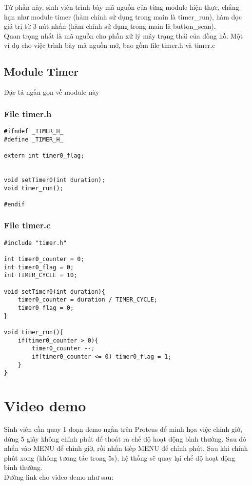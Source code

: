 Từ phần này, sinh viên trình bày mã nguồn của từng module hiện thực, chẳng hạn như module timer (hàm chính sử dụng trong main là timer\_run), hàm đọc giá trị từ 3 nút nhấn (hàm chính sử dụng trong main là button\_scan). \\

Quan trọng nhất là mã nguồn cho phần xử lý máy trạng thái của đồng hồ. Một ví dụ cho việc trình bày mã nguồn mở, bao gồm file timer.h và timer.c

\subsection{Module Timer}
Đặc tả ngắn gọn về module này
\subsubsection{File timer.h}
\begin{lstlisting}[caption=Mã nguồn file .h]
#ifndef _TIMER_H_
#define _TIMER_H_

extern int timer0_flag;


void setTimer0(int duration);
void timer_run();

#endif
\end{lstlisting}
\subsubsection{File timer.c}
\begin{lstlisting}[caption=Mã nguồn file .c]
#include "timer.h"

int timer0_counter = 0;
int timer0_flag = 0;
int TIMER_CYCLE = 10;

void setTimer0(int duration){
	timer0_counter = duration / TIMER_CYCLE;
	timer0_flag = 0;
}

void timer_run(){
	if(timer0_counter > 0){
		timer0_counter --;
		if(timer0_counter <= 0) timer0_flag = 1;
	}
}
\end{lstlisting}


\section{Video demo}
Sinh viên cần quay 1 đoạn demo ngắn trên Proteus để minh họa việc chỉnh giờ, dừng 5 giây không chỉnh phút để thoát ra chế độ hoạt động bình thường. Sau đó nhấn vào MENU để chỉnh giờ, rồi nhấn tiếp MENU để chỉnh phút. Sau khi chỉnh phút xong (không tương tác trong 5s), hệ thống sẽ quay lại chế độ hoạt động bình thường.\\

Đường link cho video demo như sau:
\begin{center}
\end{center}